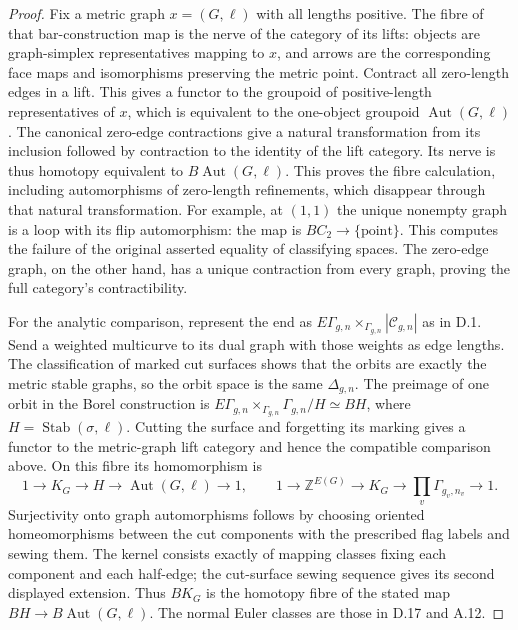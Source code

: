 \begin{proof}
Fix a metric graph $x=(G,\ell)$ with all lengths positive. The fibre of that bar-construction map is the nerve of the category of its lifts: objects are graph-simplex representatives mapping to $x$, and arrows are the corresponding face maps and isomorphisms preserving the metric point. Contract all zero-length edges in a lift. This gives a functor to the groupoid of positive-length representatives of $x$, which is equivalent to the one-object groupoid $\operatorname{Aut}(G,\ell)$. The canonical zero-edge contractions give a natural transformation from its inclusion followed by contraction to the identity of the lift category. Its nerve is thus homotopy equivalent to $B\operatorname{Aut}(G,\ell)$. This proves the fibre calculation, including automorphisms of zero-length refinements, which disappear through that natural transformation. For example, at $(1,1)$ the unique nonempty graph is a loop with its flip automorphism: the map is $BC_2\to\{\text{point}\}$. This computes the failure of the original asserted equality of classifying spaces. The zero-edge graph, on the other hand, has a unique contraction from every graph, proving the full category's contractibility.

For the analytic comparison, represent the end as
$E\Gamma_{g,n}\times_{\Gamma_{g,n}}|\mathcal C_{g,n}|$
as in D.1. Send a weighted multicurve to its dual graph with those weights as edge lengths. The classification of marked cut surfaces shows that the orbits are exactly the metric stable graphs, so the orbit space is the same $\Delta_{g,n}$. The preimage of one orbit in the Borel construction is
$E\Gamma_{g,n}\times_{\Gamma_{g,n}}\Gamma_{g,n}/H\simeq BH$,
where $H=\operatorname{Stab}(\sigma,\ell)$.
Cutting the surface and forgetting its marking gives a functor to the metric-graph lift category and hence the compatible comparison above. On this fibre its homomorphism is
\[
 1\longrightarrow K_G\longrightarrow H
 \longrightarrow\operatorname{Aut}(G,\ell)\longrightarrow1,
 \qquad
 1\longrightarrow\mathbb Z^{E(G)}
 \longrightarrow K_G
 \longrightarrow\prod_v\Gamma_{g_v,n_v}\longrightarrow1.
\]
Surjectivity onto graph automorphisms follows by choosing oriented homeomorphisms between the cut components with the prescribed flag labels and sewing them. The kernel consists exactly of mapping classes fixing each component and each half-edge; the cut-surface sewing sequence gives its second displayed extension. Thus $BK_G$ is the homotopy fibre of the stated map $BH\to B\operatorname{Aut}(G,\ell)$. The normal Euler classes are those in D.17 and A.12.
\end{proof}

